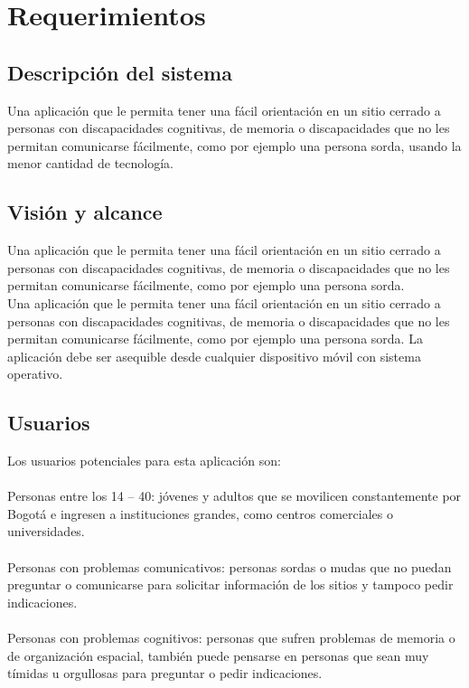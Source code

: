 \documentclass[11pt]{book}
\begin{document}
\section{Requerimientos}
\subsection{Descripción del sistema}
Una aplicación que le permita tener una fácil orientación en un sitio cerrado a personas con discapacidades cognitivas, de memoria o discapacidades que no les permitan comunicarse fácilmente, como por ejemplo una persona sorda, usando la menor cantidad de tecnología.
\subsection{Visión y alcance}
Una aplicación que le permita tener una fácil orientación en un sitio cerrado a personas con discapacidades cognitivas, de memoria o discapacidades que no les permitan comunicarse fácilmente, como por ejemplo una persona sorda.\\
Una aplicación que le permita tener una fácil orientación en un sitio cerrado a personas con discapacidades cognitivas, de memoria o discapacidades que no les permitan comunicarse fácilmente, como por ejemplo una persona sorda. La aplicación debe ser asequible desde cualquier dispositivo móvil con sistema operativo.
\subsection{Usuarios}
Los usuarios potenciales para esta aplicación son:\\\\
Personas entre los 14 – 40: jóvenes y adultos que se movilicen constantemente por Bogotá e ingresen a instituciones grandes, como centros comerciales o universidades.\\\\
Personas con problemas comunicativos: personas sordas o mudas que no puedan preguntar o comunicarse para solicitar información de los sitios y tampoco pedir indicaciones.\\\\
Personas con problemas cognitivos: personas que sufren problemas de memoria o de organización espacial, también puede pensarse en personas que sean muy tímidas u orgullosas para preguntar o pedir indicaciones.
\end{document}
